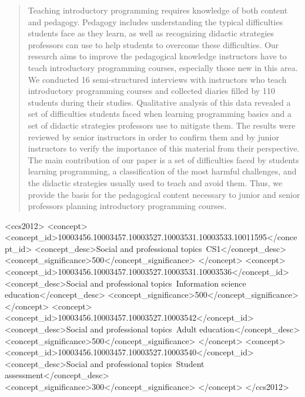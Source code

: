 \documentclass[sigconf]{acmart}
\begin{document}
%
\begin{abstract}
Teaching introductory programming requires knowledge of both content and pedagogy. Pedagogy includes understanding the typical difficulties students face as they learn, as well as recognizing didactic strategies professors can use to help students to overcome these difficulties. Our research aims to improve the pedagogical knowledge instructors have to teach introductory programming courses, especially those new in this area. We conducted 16 semi-structured interviews with instructors who teach introductory programming courses and collected diaries filled by 110 students during their studies. Qualitative analysis of this data revealed a set of difficulties students faced when learning programming basics and a set of didactic strategies professors use to mitigate them. The results were reviewed by senior instructors in order to confirm them and by junior instructors to verify the importance of this material from their perspective. The main contribution of our paper is a set of difficulties faced by students learning programming, a classification of the most harmful challenges, and the didactic strategies usually used to teach and avoid them. Thus, we provide the basis for the pedagogical content necessary to junior and senior professors planning introductory programming courses.
\end{abstract}

%
%


\begin{CCSXML}

<ccs2012>
<concept>
<concept_id>10003456.10003457.10003527.10003531.10003533.10011595</concept_id>
<concept_desc>Social and professional topics~CS1</concept_desc>
<concept_significance>500</concept_significance>
</concept>
<concept>
<concept_id>10003456.10003457.10003527.10003531.10003536</concept_id>
<concept_desc>Social and professional topics~Information science education</concept_desc>
<concept_significance>500</concept_significance>
</concept>
<concept>
<concept_id>10003456.10003457.10003527.10003542</concept_id>
<concept_desc>Social and professional topics~Adult education</concept_desc>
<concept_significance>500</concept_significance>
</concept>
<concept>
<concept_id>10003456.10003457.10003527.10003540</concept_id>
<concept_desc>Social and professional topics~Student assessment</concept_desc>
<concept_significance>300</concept_significance>
</concept>
</ccs2012>
\end{CCSXML}
\end{document}
